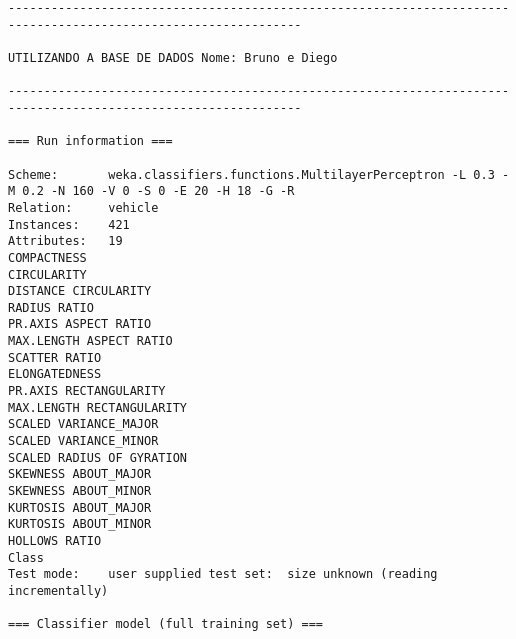 \documentclass[
	article,			%
	11pt,				%
	oneside,			%
	a4paper,			%
	english,			%
	brazil,				%
	sumario=tradicional
	]{abntex2}
\begin{document}
\begin{lstlisting}
---------------------------------------------------------------------------------------------------------------

UTILIZANDO A BASE DE DADOS Nome: Bruno e Diego

---------------------------------------------------------------------------------------------------------------

=== Run information ===

Scheme:       weka.classifiers.functions.MultilayerPerceptron -L 0.3 -M 0.2 -N 160 -V 0 -S 0 -E 20 -H 18 -G -R
Relation:     vehicle
Instances:    421
Attributes:   19
COMPACTNESS
CIRCULARITY
DISTANCE CIRCULARITY
RADIUS RATIO
PR.AXIS ASPECT RATIO
MAX.LENGTH ASPECT RATIO
SCATTER RATIO
ELONGATEDNESS
PR.AXIS RECTANGULARITY
MAX.LENGTH RECTANGULARITY
SCALED VARIANCE_MAJOR
SCALED VARIANCE_MINOR
SCALED RADIUS OF GYRATION
SKEWNESS ABOUT_MAJOR
SKEWNESS ABOUT_MINOR
KURTOSIS ABOUT_MAJOR
KURTOSIS ABOUT_MINOR
HOLLOWS RATIO
Class
Test mode:    user supplied test set:  size unknown (reading incrementally)

=== Classifier model (full training set) ===


\end{lstlisting}
\end{document}
